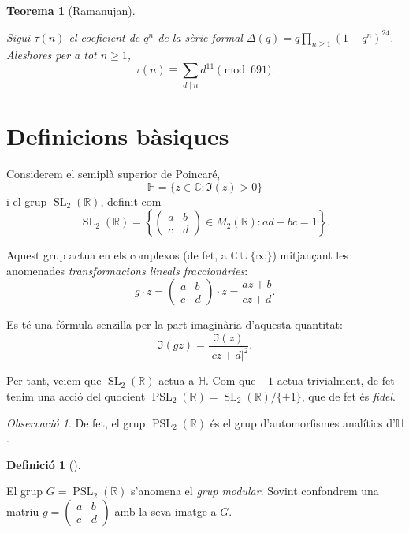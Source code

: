 \documentclass[
  letterpaper,
  DIV=11,
  numbers=noendperiod]{scrreprt}
\theoremstyle{plain}
\newtheorem{theorem}{Teorema}[chapter]
\theoremstyle{plain}
\theoremstyle{definition}
\newtheorem{definition}{Definició}[chapter]
\theoremstyle{plain}
\theoremstyle{plain}
\theoremstyle{definition}
\theoremstyle{remark}
\newtheorem{refremark}{Observació}[chapter]
\begin{document}
\begin{theorem}[Ramanujan]\protect\hypertarget{thm-ramanujan}{}\label{thm-ramanujan}

Sigui \(\tau(n)\) el coeficient de \(q^n\) de la sèrie formal
\(\Delta(q)=q\prod_{n\geq 1} (1-q^n)^{24}\). Aleshores per a tot
\(n\geq 1\), \[
\tau(n) \equiv \sum_{d\mid n} d^{11} \pmod{691}.
\]

\end{theorem}

\section{Definicions bàsiques}\label{definicions-buxe0siques}

Considerem el semiplà superior de Poincaré, \[
\mathbb{H}= \{z\in \mathbb{C}: \Im(z) >0\}
\] i el grup \(\operatorname{SL}_2(\mathbb{R})\), definit com \[
\operatorname{SL}_2(\mathbb{R}) = \left\{ \left(\begin{smallmatrix}a&b\\c&d\end{smallmatrix}\right) \in M_2(\mathbb{R}) : ad-bc = 1\right\}.
\]

Aquest grup actua en els complexos (de fet, a
\(\mathbb{C} \cup \{\infty\}\)) mitjançant les anomenades
\emph{transformacions lineals fraccionàries}: \[
g\cdot z =\left(\begin{smallmatrix}a&b\\c&d\end{smallmatrix}\right)\cdot z = \frac{az+b}{cz+d}.
\]

Es té una fórmula senzilla per la part imaginària d'aquesta quantitat:
\[
\Im(gz) = \frac{\Im(z)}{ |cz+d|^2}.
\]

Per tant, veiem que \(\operatorname{SL}_2(\mathbb{R})\) actua a
\(\mathbb{H}\). Com que \(-1\) actua trivialment, de fet tenim una acció
del quocient
\(\operatorname{PSL}_2(\mathbb{R}) = \operatorname{SL}_2(\mathbb{R})/\{\pm 1\}\),
que de fet és \emph{fidel}.

\begin{refremark}
De fet, el grup \(\operatorname{PSL}_2(\mathbb{R})\) és el grup
d'automorfismes analítics d'\(\mathbb{H}\).

\label{rem-}

\end{refremark}

\begin{definition}[]\protect\hypertarget{def-grup-modular}{}\label{def-grup-modular}

El grup \(G = \operatorname{PSL}_2(\mathbb{R})\) s'anomena el \emph{grup
modular}. Sovint confondrem una matriu
\(g = \left(\begin{smallmatrix}a&b\\c&d\end{smallmatrix}\right)\) amb la
seva imatge a \(G\).

\end{definition}
\end{document}
